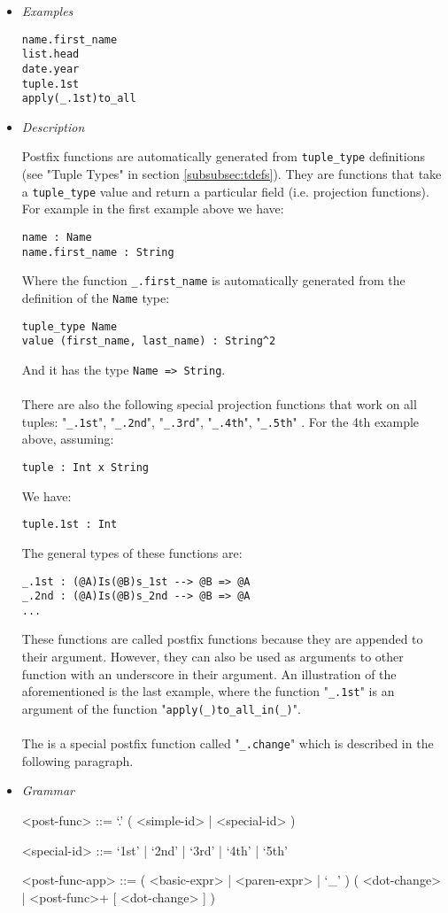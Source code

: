 \documentclass{article}
\begin{document}
\begin{itemize}

\item \textit{Examples}
\begin{verbatim}
name.first_name
list.head
date.year
tuple.1st
apply(_.1st)to_all
\end{verbatim}

\item \textit{Description}

Postfix functions are automatically generated from \verb|tuple_type|
definitions (see "Tuple Types" in section \ref{subsubsec:tdefs}). They are
functions that take a \verb|tuple_type| value and return a particular field
(i.e. projection functions). For example in the first example above we have:
\begin{verbatim}
name : Name
name.first_name : String
\end{verbatim}
Where the function \verb|_.first_name| is automatically generated from the
definition of the \verb|Name| type:
\begin{verbatim}
tuple_type Name
value (first_name, last_name) : String^2
\end{verbatim}
And it has the type \verb|Name => String|.
\\\\
There are also the following special projection functions that work on all
tuples:
"\verb|_.1st|", "\verb|_.2nd|", "\verb|_.3rd|", "\verb|_.4th|", "\verb|_.5th|"
.
For the 4th example above, assuming:
\begin{verbatim}
tuple : Int x String
\end{verbatim}
We have:
\begin{verbatim}
tuple.1st : Int
\end{verbatim}
The general types of these functions are:
\begin{verbatim}
_.1st : (@A)Is(@B)s_1st --> @B => @A
_.2nd : (@A)Is(@B)s_2nd --> @B => @A
...
\end{verbatim}
These functions are called postfix functions because they are appended to their
argument. However, they can also be used as arguments to other function with an
underscore in their argument.  An illustration of the aforementioned is the
last example, where the function "\verb|_.1st|" is an argument of the function
"\verb|apply(_)to_all_in(_)|".
\\\\
The is a special postfix function called "\verb|_.change|" which is described
in the following paragraph.

\item \textit{Grammar}
\begin{grammar}
<post-func> ::= `.' ( <simple-id> | <special-id> )

<special-id> ::= `1st' | `2nd' | `3rd' | `4th' | `5th'

<post-func-app> ::=
( <basic-expr> | <paren-expr> | `_' )
( <dot-change> | <post-func>+ [ <dot-change> ] )
\end{grammar}

\end{itemize}
\end{document}
